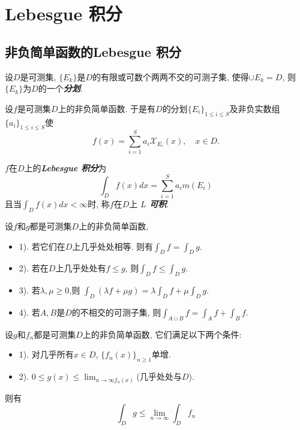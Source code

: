 \documentclass[12pt, a4paper, oneside, UTF8]{ctexbook}  %
\begin{document}
\else
\fi

\chapter{Lebesgue 积分}
\section{非负简单函数的Lebesgue 积分}

\par 设$D$是可测集, $\{E_k\}$是$D$的有限或可数个两两不交的可测子集, 使得$\cup E_k=D$, 则$\{E_k\}$为$D$的一个\textbf{\emph{分划}}.
\par 设$f$是可测集$D$上的非负简单函数. 于是有$D$的分划$\{E_i\}_{1\leq i\leq S}$及非负实数组$\{a_i\}_{1\leq i\leq S}$使
                    $$ f(x) = \sum_{i=1}^{S}a_i\mathcal{X}_{E_i}(x), \quad x\in D.  $$
\begin{defn}
    $f$在$D$上的\textbf{\emph{Lebesgue 积分}}为
    \begin{equation}
        \int_{D}f(x)dx=\sum_{i=1}^{S}a_im(E_i)
    \end{equation}
    且当$\int_{D}f(x)dx<\infty$时, 称$f$在$D$上 \textbf{\emph{$L$ 可积}}.
\end{defn}

\begin{thm}
    设$f$和$g$都是可测集$D$上的非负简单函数, 
    \begin{itemize}
        \item 1). 若它们在$D$上几乎处处相等. 则有$ \int_{D}f = \int_{D}g $.
        \item 2). 若在$D$上几乎处处有$f\leq g$, 则$ \int_{D}f \leq \int_{D}g $.
        \item 3). 若$\lambda, \mu \geq 0$,则 $\int _{D}(\lambda f + \mu g)=\lambda\int _{D}f+\mu\int _{D}g$.
        \item 4). 若$A, B$是$D$的不相交的可测子集, 则$\int _{A\cup B}f=\int_{A}f+\int_{B}f$.
    \end{itemize}
\end{thm}

\begin{lemma}
    设$g$和$f_n$都是可测集$D$上的非负简单函数, 它们满足以下两个条件:
    \begin{itemize}
        \item 1). 对几乎所有$x\in D$, $\{ f_n(x)\}_{n\geq 1}$单增.
        \item 2). $0\leq g(x) \leq \lim_{n\to\infty f_n(x)}$(几乎处处与$D$).
    \end{itemize}
    则有$$\int _{D}g \leq \lim_{n\to\infty}\int_{D}f_n$$
\end{lemma}
\end{document}

